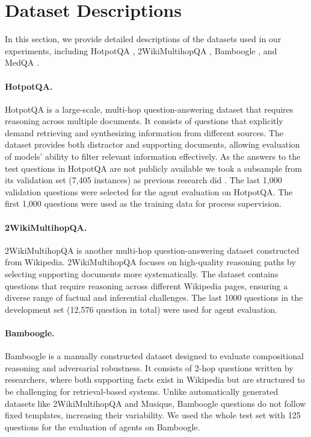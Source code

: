 \section{Dataset Descriptions}

In this section, we provide detailed descriptions of the datasets used in our experiments, including HotpotQA \cite{yang2018hotpotqa}, 2WikiMultihopQA \cite{ho2020constructing}, Bamboogle \cite{press2023measuring}, and MedQA \cite{jin2021disease}.

\paragraph{HotpotQA.}
HotpotQA is a large-scale, multi-hop question-answering dataset that requires reasoning across multiple documents. It consists of questions that explicitly demand retrieving and synthesizing information from different sources. The dataset provides both distractor and supporting documents, allowing evaluation of models' ability to filter relevant information effectively. As the answers to the test questions in HotpotQA are not publicly available we took a subsample from its validation set (7,405 instances) as previous research did \cite{yao2023react,li2025search}. The last 1,000 validation questions were selected for the agent evaluation on HotpotQA. The first 1,000 questions were used as the training data for process supervision.

\paragraph{2WikiMultihopQA.}
2WikiMultihopQA is another multi-hop question-answering dataset constructed from Wikipedia.  2WikiMultihopQA focuses on high-quality reasoning paths by selecting supporting documents more systematically. The dataset contains questions that require reasoning across different Wikipedia pages, ensuring a diverse range of factual and inferential challenges. The last 1000 questions in the development set (12,576 question in total) were used for agent evaluation.

\paragraph{Bamboogle.}
Bamboogle is a manually constructed dataset designed to evaluate compositional reasoning and adversarial robustness. It consists of 2-hop questions written by researchers, where both supporting facts exist in Wikipedia but are structured to be challenging for retrieval-based systems. Unlike automatically generated datasets like 2WikiMultihopQA and Musique, Bamboogle questions do not follow fixed templates, increasing their variability. We used the whole test set with 125 questions for the evaluation of agents on Bamboogle.

